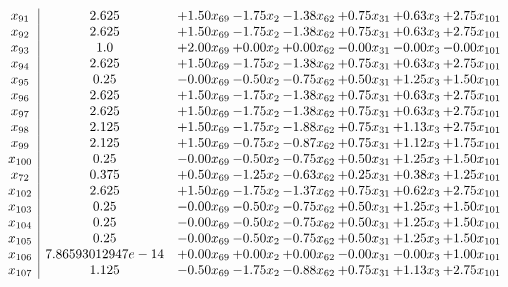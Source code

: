 \documentclass[8pt]{article}
\begin{document}
\[\begin{array}{c| c c@{\hskip 2pt} c@{\hskip 2pt} c@{\hskip 2pt} c@{\hskip 2pt} c@{\hskip 2pt} c@{\hskip 2pt} }
 x_{91}   &  2.625 & +  1.50 x_{69} & -1.75 x_{2} & -1.38 x_{62} & +  0.75 x_{31} & +  0.63 x_{3} & +  2.75 x_{101}\\
 x_{92}   &  2.625 & +  1.50 x_{69} & -1.75 x_{2} & -1.38 x_{62} & +  0.75 x_{31} & +  0.63 x_{3} & +  2.75 x_{101}\\
 x_{93}   &  1.0 & +  2.00 x_{69} & +  0.00 x_{2} & +  0.00 x_{62} & -0.00 x_{31} & -0.00 x_{3} & -0.00 x_{101}\\
 x_{94}   &  2.625 & +  1.50 x_{69} & -1.75 x_{2} & -1.38 x_{62} & +  0.75 x_{31} & +  0.63 x_{3} & +  2.75 x_{101}\\
 x_{95}   &  0.25 & -0.00 x_{69} & -0.50 x_{2} & -0.75 x_{62} & +  0.50 x_{31} & +  1.25 x_{3} & +  1.50 x_{101}\\
 x_{96}   &  2.625 & +  1.50 x_{69} & -1.75 x_{2} & -1.38 x_{62} & +  0.75 x_{31} & +  0.63 x_{3} & +  2.75 x_{101}\\
 x_{97}   &  2.625 & +  1.50 x_{69} & -1.75 x_{2} & -1.38 x_{62} & +  0.75 x_{31} & +  0.63 x_{3} & +  2.75 x_{101}\\
 x_{98}   &  2.125 & +  1.50 x_{69} & -1.75 x_{2} & -1.88 x_{62} & +  0.75 x_{31} & +  1.13 x_{3} & +  2.75 x_{101}\\
 x_{99}   &  2.125 & +  1.50 x_{69} & -0.75 x_{2} & -0.87 x_{62} & +  0.75 x_{31} & +  1.12 x_{3} & +  1.75 x_{101}\\
 x_{100}   &  0.25 & -0.00 x_{69} & -0.50 x_{2} & -0.75 x_{62} & +  0.50 x_{31} & +  1.25 x_{3} & +  1.50 x_{101}\\
 x_{72}   &  0.375 & +  0.50 x_{69} & -1.25 x_{2} & -0.63 x_{62} & +  0.25 x_{31} & +  0.38 x_{3} & +  1.25 x_{101}\\
 x_{102}   &  2.625 & +  1.50 x_{69} & -1.75 x_{2} & -1.37 x_{62} & +  0.75 x_{31} & +  0.62 x_{3} & +  2.75 x_{101}\\
 x_{103}   &  0.25 & -0.00 x_{69} & -0.50 x_{2} & -0.75 x_{62} & +  0.50 x_{31} & +  1.25 x_{3} & +  1.50 x_{101}\\
 x_{104}   &  0.25 & -0.00 x_{69} & -0.50 x_{2} & -0.75 x_{62} & +  0.50 x_{31} & +  1.25 x_{3} & +  1.50 x_{101}\\
 x_{105}   &  0.25 & -0.00 x_{69} & -0.50 x_{2} & -0.75 x_{62} & +  0.50 x_{31} & +  1.25 x_{3} & +  1.50 x_{101}\\
 x_{106}   &  7.86593012947e-14 & +  0.00 x_{69} & +  0.00 x_{2} & +  0.00 x_{62} & -0.00 x_{31} & -0.00 x_{3} & +  1.00 x_{101}\\
 x_{107}   &  1.125 & -0.50 x_{69} & -1.75 x_{2} & -0.88 x_{62} & +  0.75 x_{31} & +  1.13 x_{3} & +  2.75 x_{101}\\

\end{array}\]
\end{document}

